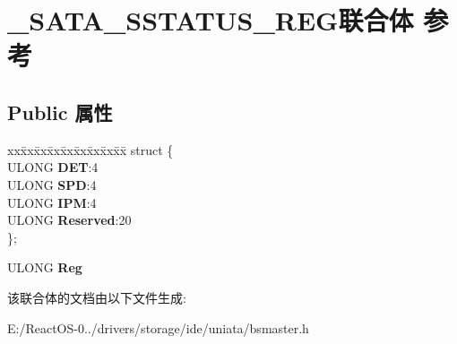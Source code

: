 \hypertarget{union___s_a_t_a___s_s_t_a_t_u_s___r_e_g}{}\section{\+\_\+\+S\+A\+T\+A\+\_\+\+S\+S\+T\+A\+T\+U\+S\+\_\+\+R\+E\+G联合体 参考}
\label{union___s_a_t_a___s_s_t_a_t_u_s___r_e_g}
\subsection*{Public 属性}
\begin{DoxyCompactItemize}
\item 
\mbox{\label{union___s_a_t_a___s_s_t_a_t_u_s___r_e_g_ac970f8943e5786582971790e251c2bf5}} 
\begin{tabbing}
xx\=xx\=xx\=xx\=xx\=xx\=xx\=xx\=xx\=\kill
struct \{\\
\>ULONG {\bfseries DET}:4\\
\>ULONG {\bfseries SPD}:4\\
\>ULONG {\bfseries IPM}:4\\
\>ULONG {\bfseries Reserved}:20\\
\}; \\

\end{tabbing}\item 
\mbox{\label{union___s_a_t_a___s_s_t_a_t_u_s___r_e_g_a1d553319768a3b3d558756b03e908391}} 
U\+L\+O\+NG {\bfseries Reg}
\end{DoxyCompactItemize}


该联合体的文档由以下文件生成\+:\begin{DoxyCompactItemize}
\item 
E\+:/\+React\+O\+S-\/0../drivers/storage/ide/uniata/bsmaster.\+h\end{DoxyCompactItemize}
